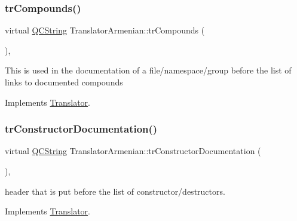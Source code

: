 \mbox{\label{class_translator_armenian_a6413543e62da2095ee2dc363eb72c806}} 
\subsubsection{\texorpdfstring{trCompounds()}{trCompounds()}}
{\footnotesize\ttfamily virtual \mbox{\hyperlink{class_q_c_string}{Q\+C\+String}} Translator\+Armenian\+::tr\+Compounds (\begin{DoxyParamCaption}{ }\end{DoxyParamCaption})\hspace{0.3cm}{\ttfamily [inline]}, {\ttfamily [virtual]}}

This is used in the documentation of a file/namespace/group before the list of links to documented compounds 

Implements \mbox{\hyperlink{class_translator}{Translator}}.

\mbox{\label{class_translator_armenian_ab20625373af8cf6225334a0c519aa328}} 
\subsubsection{\texorpdfstring{trConstructorDocumentation()}{trConstructorDocumentation()}}
{\footnotesize\ttfamily virtual \mbox{\hyperlink{class_q_c_string}{Q\+C\+String}} Translator\+Armenian\+::tr\+Constructor\+Documentation (\begin{DoxyParamCaption}{ }\end{DoxyParamCaption})\hspace{0.3cm}{\ttfamily [inline]}, {\ttfamily [virtual]}}

header that is put before the list of constructor/destructors. 

Implements \mbox{\hyperlink{class_translator}{Translator}}.

\mbox{\label{class_translator_armenian_a3556a8b0bd648ff9659540c1e2d3003e}} 
